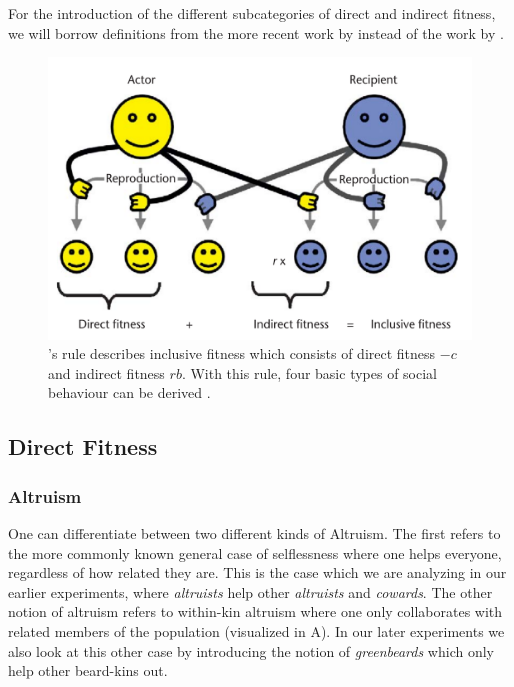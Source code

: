 \documentclass[sigconf]{acmart}
\newcommand{\cowards}{\textit{cowards}\xspace}
\newcommand{\altruists}{\textit{altruists}\xspace}
\newcommand{\greenbeards}{\textit{greenbeards}\xspace}
\begin{document}
    For the introduction of the different subcategories of direct and indirect fitness, we will borrow definitions from the more recent work by \citeauthor{west_altruism_2010} \cite{west_altruism_2010} instead of the work by \citeauthor{gardner_theory_2009} \cite{gardner_theory_2009}.

    \begin{figure}
        \includegraphics[width=\columnwidth]{figures/hamiltons_rule}
        \caption{\citeauthor{hamilton_kin_1964}'s rule describes inclusive fitness which consists of direct fitness $-c$ and indirect fitness $rb$. With this rule, four basic types of social behaviour can be derived \cite{gardner_theory_2009}.}
        \label{fig:hamilton}
    \end{figure}

    \subsection{Direct Fitness}\label{subsec:direct_fit}

    \subsubsection{Altruism}
    One can differentiate between two different kinds of Altruism.   %
    The first refers to the more commonly known general case of selflessness where one helps everyone, regardless of how related they are.
    This is the case which we are analyzing in our earlier experiments, where \altruists help other \altruists and \cowards.
    The other notion of altruism refers to within-kin altruism where one only collaborates with related members of the population (visualized in  A).
    In our later experiments we also look at this other case by introducing the notion of \greenbeards which only help other beard-kins out.
\end{document}
